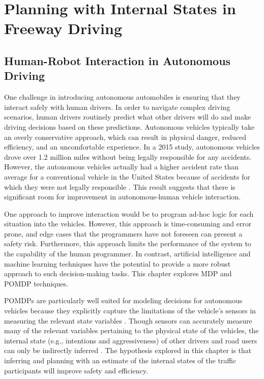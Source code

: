 \chapter{Planning with Internal States in Freeway Driving} \label{chap:multilane}

\section{Human-Robot Interaction in Autonomous Driving}

One challenge in introducing autonomous automobiles is ensuring that they interact safely with human drivers.
In order to navigate complex driving scenarios, human drivers routinely predict what other drivers will do and make driving decisions based on these predictions.
Autonomous vehicles typically take an overly conservative approach, which can result in physical danger, reduced efficiency, and an uncomfortable experience. %
In a 2015 study, autonomous vehicles drove over 1.2 million miles without being legally responsible for any accidents.
However, the autonomous vehicles actually had a higher accident rate than average for a conventional vehicle in the United States because of accidents for which they were not legally responsible \cite{schoettle2015crashes}.
This result suggests that there is significant room for improvement in autonomous-human vehicle interaction.  

One approach to improve interaction would be to program ad-hoc logic for each situation into the vehicles.
However, this approach is time-consuming and error prone, and edge cases that the programmers have not foreseen can present a safety risk.
Furthermore, this approach limits the performance of the system to the capability of the human programmer.
In contrast, artificial intelligence and machine learning techniques have the potential to provide a more robust approach to such decision-making tasks.
This chapter explores MDP and POMDP techniques.

POMDPs are particularly well suited for modeling decisions for autonomous vehicles because they explicitly capture the limitations of the vehicle's sensors in measuring the relevant state variables \cite{brechtel2013mcvi, sadigh2016gathering, bai2015intention}.
Though sensors can accurately measure many of the relevant variables pertaining to the physical state of the vehicles, the internal state (e.g., intentions and aggressiveness) of other drivers and road users can only be indirectly inferred \cite{sadigh2016gathering, bai2015intention, lam2015, dc2015}.
The hypothesis explored in this chapter is that inferring and planning with an estimate of the internal states of the traffic participants will improve safety and efficiency.

